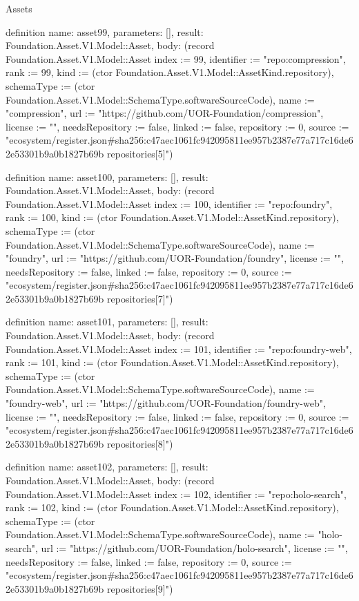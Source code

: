 \begin{lexlean}{Assets}
\begin{semanticmodule}
definition{
  name: asset99,
  parameters: [],
  result: Foundation.Asset.V1.Model::Asset,
  body: (record Foundation.Asset.V1.Model::Asset {index := 99, identifier := "repo:compression", rank := 99, kind := (ctor Foundation.Asset.V1.Model::AssetKind.repository), schemaType := (ctor Foundation.Asset.V1.Model::SchemaType.softwareSourceCode), name := "compression", url := "https://github.com/UOR-Foundation/compression", license := "", needsRepository := false, linked := false, repository := 0, source := "ecosystem/register.json#sha256:c47aec1061fc942095811ee957b2387e77a717c16de62e53301b9a0b1827b69b repositories[5]"})
}

definition{
  name: asset100,
  parameters: [],
  result: Foundation.Asset.V1.Model::Asset,
  body: (record Foundation.Asset.V1.Model::Asset {index := 100, identifier := "repo:foundry", rank := 100, kind := (ctor Foundation.Asset.V1.Model::AssetKind.repository), schemaType := (ctor Foundation.Asset.V1.Model::SchemaType.softwareSourceCode), name := "foundry", url := "https://github.com/UOR-Foundation/foundry", license := "", needsRepository := false, linked := false, repository := 0, source := "ecosystem/register.json#sha256:c47aec1061fc942095811ee957b2387e77a717c16de62e53301b9a0b1827b69b repositories[7]"})
}

definition{
  name: asset101,
  parameters: [],
  result: Foundation.Asset.V1.Model::Asset,
  body: (record Foundation.Asset.V1.Model::Asset {index := 101, identifier := "repo:foundry-web", rank := 101, kind := (ctor Foundation.Asset.V1.Model::AssetKind.repository), schemaType := (ctor Foundation.Asset.V1.Model::SchemaType.softwareSourceCode), name := "foundry-web", url := "https://github.com/UOR-Foundation/foundry-web", license := "", needsRepository := false, linked := false, repository := 0, source := "ecosystem/register.json#sha256:c47aec1061fc942095811ee957b2387e77a717c16de62e53301b9a0b1827b69b repositories[8]"})
}

definition{
  name: asset102,
  parameters: [],
  result: Foundation.Asset.V1.Model::Asset,
  body: (record Foundation.Asset.V1.Model::Asset {index := 102, identifier := "repo:holo-search", rank := 102, kind := (ctor Foundation.Asset.V1.Model::AssetKind.repository), schemaType := (ctor Foundation.Asset.V1.Model::SchemaType.softwareSourceCode), name := "holo-search", url := "https://github.com/UOR-Foundation/holo-search", license := "", needsRepository := false, linked := false, repository := 0, source := "ecosystem/register.json#sha256:c47aec1061fc942095811ee957b2387e77a717c16de62e53301b9a0b1827b69b repositories[9]"})
}


\end{semanticmodule}
\end{lexlean}
